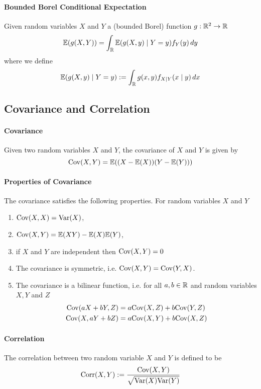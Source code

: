 \paragraph{Bounded Borel Conditional Expectation}
Given random variables \(X\) and \(Y\) a (bounded Borel) function \(g: \mathbb{R}^2 \to \mathbb{R}\)
\[\mathbb{E}(g(X,Y)) = \int_{\mathbb{R}} \mathbb{E}(g(X,y) \mid Y = y) f_Y(y) \, dy\]
where we define
\[\mathbb{E}(g(X,y) \mid Y = y) := \int_{\mathbb{R}} g(x, y)f_{X \mid Y}(x \mid y) \, dx\]

\subsection{Covariance and Correlation}
\paragraph{Covariance}
Given two random variables \(X\) and \(Y\), the covariance of \(X\) and \(Y\) is given by
\[\mathrm{Cov}(X,Y) = \mathbb{E}((X-\mathbb{E}(X))(Y-\mathbb{E}(Y)))\]

\paragraph{Properties of Covariance}
The covariance satisfies the following properties. For random variables \(X\) and \(Y\)
\begin{enumerate}
    \item \(\mathrm{Cov}(X,X) = \mathrm{Var}(X)\),
    \item \(\mathrm{Cov}(X, Y) = \mathbb{E}(XY) - \mathbb{E}(X)\mathbb{E}(Y)\),
    \item if \(X\) and \(Y\) are independent then \(\mathrm{Cov}(X,Y) = 0\)
    \item The covariance is symmetric, i.e. \(\mathrm{Cov}(X,Y) = \mathrm{Cov}(Y,X)\).
    \item The covariance is a bilinear function, i.e. for all \(a, b \in \mathbb{R}\) and random variables \(X, Y\) and \(Z\)
    \begin{align*}
        \mathrm{Cov}(aX + bY, Z) & = a\mathrm{Cov}(X, Z) + b\mathrm{Cov}(Y, Z) \\
        \mathrm{Cov}(X, aY + bZ) & = a\mathrm{Cov}(X,Y) + b\mathrm{Cov}(X, Z)
    \end{align*}
\end{enumerate}

\paragraph{Correlation}
The correlation between two random variable \(X\) and \(Y\) is defined to be
\[\mathrm{Corr}(X,Y) := \frac{\mathrm{Cov}(X,Y)}{\sqrt{\mathrm{Var}(X)\mathrm{Var}(Y)}}\]


